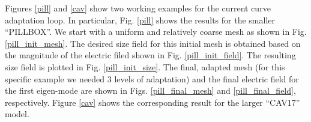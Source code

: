 \documentclass[review,12pt]{elsarticle_summary_report}
\begin{document}

Figures \ref{pill} and \ref{cav} show two working examples for the current curve adaptation loop.
In particular, Fig. \ref{pill} shows the results for the smaller ``PILLBOX''. We start with a uniform and relatively coarse mesh as shown in Fig. \ref{pill_init_mesh}. The desired size field for this initial mesh is obtained based on the magnitude of the electric filed shown in Fig. \ref{pill_init_field}. The resulting size field is plotted in Fig. \ref{pill_init_size}. The final, adapted mesh (for this specific example we needed 3 levels of adaptation) and the final electric field for the first eigen-mode are shown in Figs. \ref{pill_final_mesh} and \ref{pill_final_field}, respectively. Figure \ref{cav} shows the corresponding result for the larger ``CAV17'' model.
\end{document}
